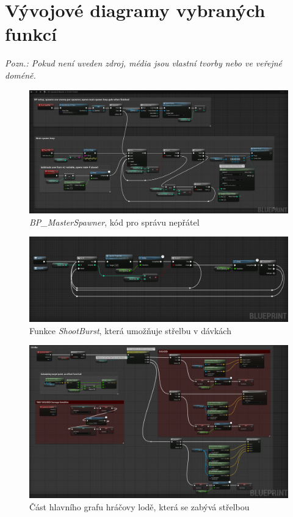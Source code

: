 \documentclass[12pt,a4paper,hidelinks]{article}
\begin{document}
\section{Vývojové diagramy vybraných funkcí}
\textit{Pozn.: Pokud není uveden zdroj, média jsou vlastní tvorby nebo ve veřejné doméně.}
\begin{landscape}
\begin{figure}[h!]
\centering
\includegraphics[width=1.0\linewidth]{images/masterspawner_nodesc.png}
\caption{\textit{BP{\_}MasterSpawner}, kód pro správu nepřátel}
\label{masterspawner}
\end{figure}
\clearpage

\begin{figure}[h!]
\centering
\includegraphics[width=1.0\linewidth]{images/shoot_burst.png}
\caption{Funkce \textit{ShootBurst}, která umožňuje střelbu v dávkách}
\label{burst}
\end{figure}
\clearpage

\begin{figure}[h!]
\centering
\includegraphics[width=1.0\linewidth]{images/player_eventgraph.png}
\caption{Část hlavního grafu hráčovy lodě, která se zabývá střelbou}
\label{burst}
\end{figure}
\clearpage


\end{landscape}
\end{document}
